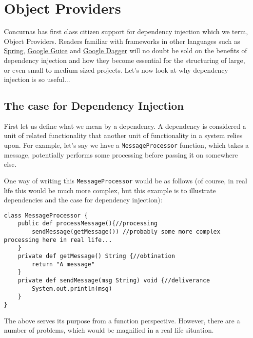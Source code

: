 \documentclass[conc-doc]{subfiles}
\begin{document}
	
	\chapter[Object Providers]{Object Providers}
	\label{ch:ObjProviders}





Concurnas has first class citizen support for dependency injection which we term, Object Providers. Readers familiar with frameworks in other languages such as \href{https://spring.io}{Spring}, \href{https://github.com/google/guice}{Google Guice} and \href{https://github.com/google/dagger}{Google Dagger} will no doubt be sold on the benefits of dependency injection and how they become essential for the structuring of large, or even small to medium sized projects. Let's now look at why dependency injection is so useful...


\section{The case for Dependency Injection}
First let us define what we mean by a dependency. A dependency is considered a unit of related functionality that another unit of functionality in a system relies upon. For example, let's say we have a \lstinline{MessageProcessor} function, which takes a message, potentially performs some processing before passing it on somewhere else. 

One way of writing this \lstinline{MessageProcessor} would be as follows (of course, in real life this would be much more complex, but this example is to illustrate dependencies and the case for dependency injection):
\begin{lstlisting}
class MessageProcessor {
	public def processMessage(){//processing
		sendMessage(getMessage()) //probably some more complex processing here in real life...
	}
	private def getMessage() String {//obtination
		return "A message"
	}
	private def sendMessage(msg String) void {//deliverance
		System.out.println(msg)
	}
}
\end{lstlisting}

The above serves its purpose from a function perspective. However, there are a number of problems, which would be magnified in a real life situation. 
\end{document}
